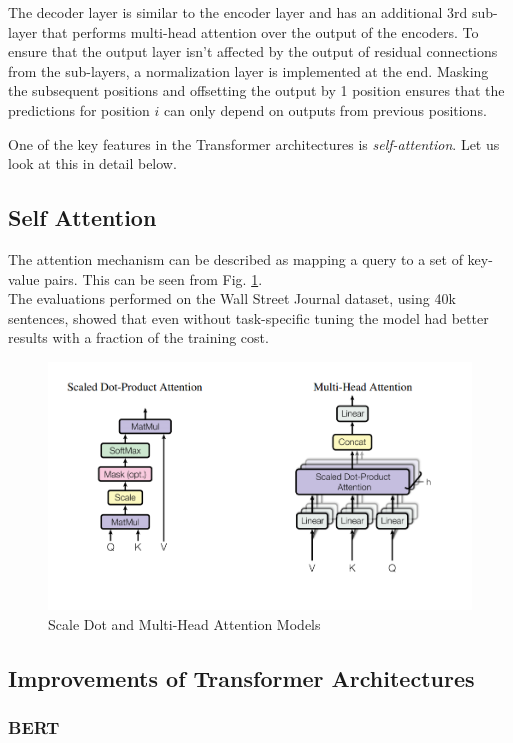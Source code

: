 \documentclass[a4paper,12pt]{report}
\begin{document}
			The decoder layer is similar to the encoder layer and has an additional 3rd sub-layer that performs multi-head attention over the output of the encoders. To ensure that the output layer isn't affected by the output of residual connections from the sub-layers, a normalization layer is implemented at the end. Masking the subsequent positions and offsetting the output by 1 position ensures that the predictions for position $ i $ can only depend on outputs from previous positions.

			One of the key features in the Transformer architectures is \textit{self-attention}. Let us look at this in detail below.
			\subsection{Self Attention}\label{231}
			The attention mechanism can be described as mapping a query to a set of key-value pairs. This can be seen from Fig. \ref{multiHeadAttention}. \\The evaluations performed on the Wall Street Journal dataset\citep{wsj}, using 40k sentences, showed that even without task-specific tuning the model had better results with a fraction of the training cost.
			\begin{figure}[h!]
				\centering
				\includegraphics[scale=0.4]{../images/multihead.png}
				\caption{Scale Dot and Multi-Head Attention Models \cite{atayl}}\label{multiHeadAttention}
			\end{figure}

		\subsection{Improvements of Transformer Architectures}\label{232}

		\subsubsection{BERT}\label{2321}
\end{document}
